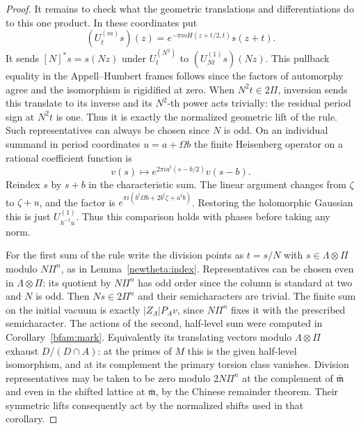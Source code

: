 \begin{proof}
It remains to check what the geometric translations and
differentiations do to this one product. In these coordinates
put
\[
  (U_t^{(m)}s)(z)=e^{-\pi mH(z+t/2,t)}s(z+t).
\]
It sends \([N]^*s=s(Nz)\) under \(U_t^{(N^2)}\) to
\((U_{Nt}^{(1)}s)(Nz)\). This pullback equality in the
Appell--Humbert frames follows since the factors of automorphy
agree and the isomorphism is rigidified at zero. When
\(N^2t\in2\Pi\), inversion sends this translate to its inverse
and its \(N^2\)-th power acts trivially: the residual period
sign at \(N^2t\) is one. Thus it is exactly the normalized
geometric lift of the rule. Such representatives can always
be chosen since \(N\) is odd. On an individual summand in
period coordinates \(u=a+\Omega b\) the finite Heisenberg
operator on a rational coefficient function is
\[
   v(s)\longmapsto
             e^{2\pi i a^t(s-b/2)}v(s-b).
\]
Reindex \(s\) by \(s+b\) in the characteristic sum. The linear
argument changes from \(\zeta\) to \(\zeta+u\), and the factor
is \(e^{\pi i(b^t\Omega b+2b^t\zeta+a^tb)}\).
Restoring the holomorphic Gaussian this is just \(U_{h^{-1}u}^{(1)}\).
Thus this comparison holds with phases before taking any norm.

For the first sum of the rule write the division points as
\(t=s/N\) with \(s\in\Lambda\otimes\Pi\) modulo \(N\Pi^n\),
as in Lemma~\ref{newtheta:index}. Representatives can be chosen
even in \(\Lambda\otimes\Pi\): its quotient by \(N\Pi^n\) has
odd order since the column is standard at two and \(N\) is odd.
Then \(Ns\in2\Pi^n\) and their semicharacters are trivial.
The finite sum on the initial vacuum is exactly
\(|Z_\Lambda|P_Av\), since \(N\Pi^n\) fixes it with the
prescribed semicharacter. The actions of the second, half-level
sum were computed in Corollary~\ref{bfam:mark}. Equivalently
its translating vectors modulo \(\Lambda\otimes\Pi\) exhaust
\(D/(D\cap A)\): at the primes of \(M\) this is the given
half-level isomorphism, and at its complement the primary torsion
class vanishes. Division representatives may be taken to be zero
modulo \(2N\Pi^n\) at the complement of \(\bar{\mathfrak m}\)
and even in the shifted lattice at \(\bar{\mathfrak m}\), by the
Chinese remainder theorem. Their symmetric lifts consequently
act by the normalized shifts used in that corollary.


\end{proof}
